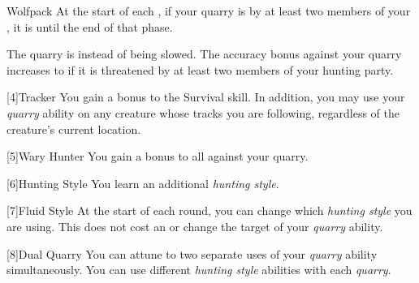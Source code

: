 {            \begin{freeability}{Wolfpack}
                At the start of each , if your quarry is  by at least two members of your , it is  until the end of that phase.

                \rankline
                 The quarry is  instead of being slowed.
                 The accuracy bonus against your quarry increases to  if it is threatened by at least two members of your hunting party.
            \end{freeability}
        }

        [4]{Tracker} You gain a  bonus to the Survival skill.
        In addition, you may use your \textit{quarry} ability on any creature whose tracks you are following, regardless of the creature's current location.

        [5]{Wary Hunter} You gain a  bonus to all  against your quarry.

        [6]{Hunting Style}
        You learn an additional \textit{hunting style}.

        [7]{Fluid Style}
        At the start of each round, you can change which \textit{hunting style} you are using.
        This does not cost an  or change the target of your \textit{quarry} ability.

        [8]{Dual Quarry} You can attune to two separate uses of your \textit{quarry} ability simultaneously.
        You can use different \textit{hunting style} abilities with each \textit{quarry}.

\newpage
